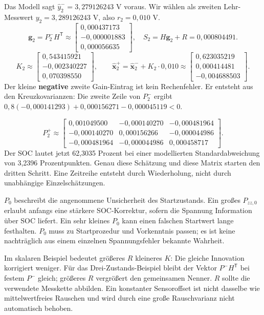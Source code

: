 Das Modell sagt $\hat y_2^-=3{,}279126243$ V voraus. Wir wählen als zweiten Lehr-Messwert $y_2=3{,}289126243$ V, also $r_2=0{,}010$ V.
\[
\mathbf g_2=P_2^-H^{\mathsf T}\approx
\begin{bmatrix}0{,}000437173\\-0{,}000001883\\0{,}000056635\end{bmatrix},\quad
S_2=H\mathbf g_2+R=0{,}000804491.
\]
\[
K_2\approx\begin{bmatrix}0{,}543415921\\-0{,}002340227\\0{,}070398550\end{bmatrix},\qquad
\hat{\mathbf x}_2^+=\hat{\mathbf x}_2^-+K_2\cdot0{,}010
\approx\begin{bmatrix}0{,}623035219\\0{,}000414481\\-0{,}004688503\end{bmatrix}.
\]
Der kleine \textbf{negative} zweite Gain-Eintrag ist kein Rechenfehler. Er entsteht aus den Kreuzkovarianzen: Die zweite Zeile von $P_2^-$ ergibt $0{,}8(-0{,}000141293)+0{,}000156271-0{,}000045119<0$.

\[
P_2^+\approx\begin{bmatrix}
0{,}001049500&-0{,}000140270&-0{,}000481964\\
-0{,}000140270&0{,}000156266&-0{,}000044986\\
-0{,}000481964&-0{,}000044986&0{,}000458717
\end{bmatrix}.
\]
Der SOC lautet jetzt 62,3035 Prozent bei einer modellierten Standardabweichung von 3,2396 Prozentpunkten. Genau diese Schätzung und diese Matrix starten den dritten Schritt. Eine Zeitreihe entsteht durch Wiederholung, nicht durch unabhängige Einzelschätzungen.

$P_0$ beschreibt die angenommene Unsicherheit des Startzustands. Ein großes $P_{zz,0}$ erlaubt anfangs eine stärkere SOC-Korrektur, sofern die Spannung Information über SOC liefert. Ein sehr kleines $P_0$ kann einen falschen Startwert lange festhalten. $P_0$ muss zu Startprozedur und Vorkenntnis passen; es ist keine nachträglich aus einem einzelnen Spannungsfehler bekannte Wahrheit.

Im skalaren Beispiel bedeutet größeres $R$ kleineres $K$: Die gleiche Innovation korrigiert weniger. Für das Drei-Zustands-Beispiel bleibt der Vektor $P^-H^{\mathsf T}$ bei festem $P^-$ gleich; größeres $R$ vergrößert den gemeinsamen Nenner. $R$ sollte die verwendete Messkette abbilden. Ein konstanter Sensoroffset ist nicht dasselbe wie mittelwertfreies Rauschen und wird durch eine große Rauschvarianz nicht automatisch behoben.

